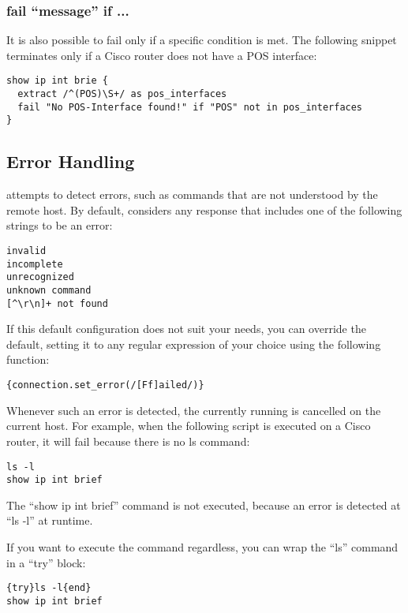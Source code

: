 \subsubsection{fail ``message'' if ...}

It is also possible to fail only if a specific condition is met. The 
following snippet terminates only if a Cisco router does not have a POS 
interface: 

\begin{lstlisting}
show ip int brie {
  extract /^(POS)\S+/ as pos_interfaces
  fail "No POS-Interface found!" if "POS" not in pos_interfaces
}
\end{lstlisting}


\subsection{Error Handling}

\product attempts to detect errors, such as commands that are not understood 
by the remote host. By default, \product considers any response that 
includes one of the following strings to be an error: 

\begin{lstlisting}
invalid
incomplete
unrecognized
unknown command
[^\r\n]+ not found
\end{lstlisting}

If this default configuration does not suit your needs, you can override the 
default, setting it to any regular expression of your choice using the 
following function: 

\begin{lstlisting}
{connection.set_error(/[Ff]ailed/)}
\end{lstlisting}

Whenever such an error is detected, the currently running \product is 
cancelled on the current host. For example, when the following script is 
executed on a Cisco router, it will fail because there is no ls command: 

\begin{lstlisting}
ls -l
show ip int brief
\end{lstlisting}

The ``show ip int brief'' command is not executed, because an error is 
detected at ``ls -l'' at runtime.

If you want to execute the command regardless, you can wrap the ``ls'' 
command in a ``try'' block: 

\begin{lstlisting}
{try}ls -l{end}
show ip int brief
\end{lstlisting}

